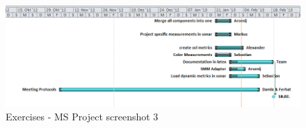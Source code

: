 \newpage

\begin{figure}[htb]
\begin{center}
\includegraphics[width=\textwidth]{msp_part3}
\caption{Exercises - MS Project screenshot 3}
\end{center}
\end{figure}
